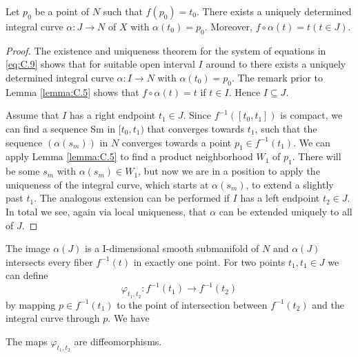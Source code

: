 \begin{lemma}\label{lemma:C.6}
  Let $p_0$ be a point of $N$ such that $f(p_0) = t_0$. There exists a uniquely
  determined integral curve $\alpha:J\to N$ of $X$ with $\alpha(t_0)=p_0$. Moreover, 
  $f\circ\alpha(t) = t (t\in J)$.
\end{lemma}

\begin{proof}
  The existence and uniqueness theorem for the system of equations in \eqref{eq:C.9}
  shows that for suitable open interval $I$ around to there exists a uniquely determined
  integral curve $\alpha:I\to N$ with $\alpha(t_0) = p_0$. The remark prior to Lemma \ref{lemma:C.5} 
  shows that $f\circ\alpha(t) = t$ if $t\in I$. Hence $I\subseteq J$.

  Assume that $I$ has a right endpoint $t_1\in J$. Since $f^{-1}([t_0, t_1])$ is compact,
  we can find a sequence Sm in $[t_0, t_1)$ that converges towards $t_1$, such that the
  sequence $(\alpha(s_m))$ in $N$ converges towards a point $p_1\in f^{-1}(t_1)$. We can apply
  Lemma \ref{lemma:C.5} to find a product neighborhood $W_1$ of $p_1$. There will be some $s_m$
  with $\alpha(s_m)\in W_1$, but now we are in a position to apply the uniqueness of the
  integral curve, which starts at $\alpha(s_m)$, to extend a slightly past $t_1$. The analogous
  extension can be performed if $I$ has a left endpoint $t_2\in J$. In total we see, again
  via local uniqueness, that $\alpha$ can be extended uniquely to all of $J$.
\end{proof}

The image $\alpha(J)$ is a I-dimensional smooth submanifold of $N$ and $\alpha(J)$ intersects
every fiber $f^{-1}(t)$ in exactly one point. For two points $t_1,t_1\in J$ we can define
\[
  \varphi_{t_1, t_2}:f^{-1}(t_1)\to f^{-1}(t_2)
\]
by mapping $p\in f^{-1}(t_1)$ to the point of intersection between $f^{-1}(t_2)$ and the integral curve 
through $p$. We have 
\begin{lemma}\label{lemma:C.7}
  The maps $\varphi_{t_1, t_2}$ are diffeomorphisms.
\end{lemma}

